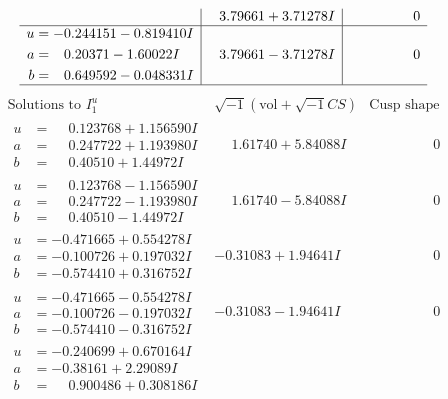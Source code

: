 \documentclass[1p]{elsarticle_modified}
\theoremstyle{definition}
\newcommand{\I}{\sqrt{-1}}
\begin{document}
$$\begin{array}{c|c|c}
 & \phantom{-}3.79661 + 3.71278 I & \phantom{-0.000000 } 0 \\ \hline\begin{aligned}
u &= -0.244151 - 0.819410 I \\
a &= \phantom{-}0.20371 - 1.60022 I \\
b &= \phantom{-}0.649592 - 0.048331 I\end{aligned}
 & \phantom{-}3.79661 - 3.71278 I & \phantom{-0.000000 } 0\\
 \hline 
 \end{array}$$\newpage$$\begin{array}{c|c|c}  
\text{Solutions to }I^u_{1}& \I (\text{vol} + \sqrt{-1}CS) & \text{Cusp shape}\\
 \hline 
\begin{aligned}
u &= \phantom{-}0.123768 + 1.156590 I \\
a &= \phantom{-}0.247722 + 1.193980 I \\
b &= \phantom{-}0.40510 + 1.44972 I\end{aligned}
 & \phantom{-}1.61740 + 5.84088 I & \phantom{-0.000000 } 0 \\ \hline\begin{aligned}
u &= \phantom{-}0.123768 - 1.156590 I \\
a &= \phantom{-}0.247722 - 1.193980 I \\
b &= \phantom{-}0.40510 - 1.44972 I\end{aligned}
 & \phantom{-}1.61740 - 5.84088 I & \phantom{-0.000000 } 0 \\ \hline\begin{aligned}
u &= -0.471665 + 0.554278 I \\
a &= -0.100726 + 0.197032 I \\
b &= -0.574410 + 0.316752 I\end{aligned}
 & -0.31083 + 1.94641 I & \phantom{-0.000000 } 0 \\ \hline\begin{aligned}
u &= -0.471665 - 0.554278 I \\
a &= -0.100726 - 0.197032 I \\
b &= -0.574410 - 0.316752 I\end{aligned}
 & -0.31083 - 1.94641 I & \phantom{-0.000000 } 0 \\ \hline\begin{aligned}
u &= -0.240699 + 0.670164 I \\
a &= -0.38161 + 2.29089 I \\
b &= \phantom{-}0.900486 + 0.308186 I\end{aligned}

\end{array}$$
\end{document}
